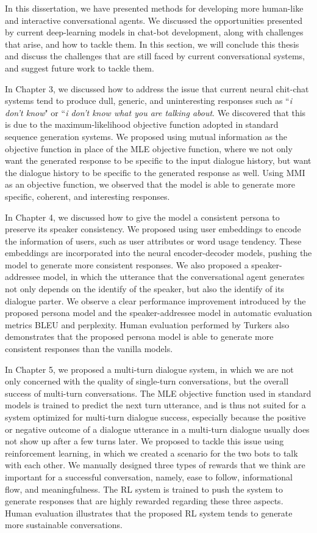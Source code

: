 In this dissertation, we have presented methods for developing more human-like and interactive 
 conversational agents. We discussed the opportunities presented by 
current deep-learning models in chat-bot development, along with challenges that arise, and how to tackle them. 
In this section, we will conclude this thesis and discuss the challenges that are still faced by 
current conversational systems, and suggest future work to tackle them.

In Chapter 3, we discussed 
how to address 
the issue that current neural chit-chat systems tend to 
produce  dull, generic, and uninteresting responses such as ``{\it i don't know}" or 
``{\it i don't know what you are talking about}. We discovered that this is due to the maximum-likelihood objective function
adopted in standard sequence generation systems. We proposed using  mutual information 
as the objective function in  place of the MLE objective function, where we not only want the generated response to be specific 
to the input dialogue history, but  want the dialogue history to be specific to the generated response as well.
Using  MMI as an objective function, we observed that the model is able to generate more specific, coherent, and 
interesting responses. 


In Chapter 4, we discussed how to give the model a consistent persona to preserve its speaker consistency. 
We proposed using user embeddings to encode the information of users, such as user attributes or word usage tendency. 
These embeddings are incorporated into the neural encoder-decoder models, pushing the model to generate more consistent responses. 
We also proposed a speaker-addressee model, in which the utterance that the conversational agent  generates not only
depends on the identify of the speaker, but also the identify of its dialogue parter. 
We observe a clear performance improvement introduced by the proposed persona model and the speaker-addressee model in automatic evaluation
metrics BLEU and perplexity. 
Human evaluation performed by Turkers also demonstrates that the proposed persona model is able to generate more consistent responses than
the vanilla \sts models.

In Chapter 5, we proposed a 
multi-turn dialogue
system, in which we are not only  concerned with the quality of single-turn conversations,  
but the overall success of multi-turn conversations. The MLE objective function used in standard \sts models is trained to predict the next turn utterance, and is thus
 not suited for a system optimized 
for multi-turn dialogue success, especially because the positive or negative outcome of a dialogue utterance in a multi-turn dialogue usually does not show up after a few turns later. 
We proposed to tackle this issue using reinforcement learning, in which we created a scenario for the two bots to talk with each other. We manually designed three types of rewards that we 
think are important for a successful conversation, namely, ease to follow, informational flow, and meaningfulness. The RL system is trained to push the system 
to generate responses that are highly rewarded regarding these three aspects. Human evaluation illustrates that the proposed RL system tends to generate more sustainable conversations. 

